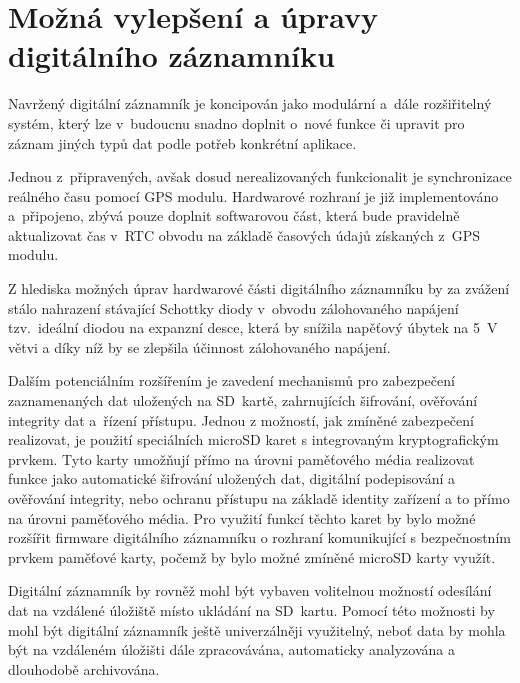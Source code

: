 \section{Možná vylepšení a úpravy digitálního záznamníku}
\label{mozne_rozsireni}
Navržený digitální záznamník je koncipován jako modulární a~dále rozšiřitelný systém, který lze v~budoucnu snadno doplnit o~nové funkce či upravit pro záznam jiných typů dat podle potřeb konkrétní aplikace.

Jednou z~připravených, avšak dosud nerealizovaných funkcionalit je synchronizace reálného času pomocí GPS modulu. Hardwarové rozhraní je již implementováno a~připojeno, zbývá pouze doplnit softwarovou část, která bude pravidelně aktualizovat čas v~RTC obvodu na základě časových údajů získaných z~GPS modulu.

Z hlediska možných úprav hardwarové části digitálního záznamníku by za zvážení stálo nahrazení stávající Schottky diody v~obvodu zálohovaného napájení tzv.~ideální diodou na expanzní desce, která by snížila napěťový úbytek na \SI{5}{\volt} větvi a díky níž by se zlepšila účinnost zálohovaného napájení.

Dalším potenciálním rozšířením je zavedení mechanismů pro zabezpečení zaznamenaných dat uložených na SD~kartě, zahrnujících šifrování, ověřování integrity dat a~řízení přístupu. Jednou z možností, jak zmíněné zabezpečení realizovat, je použití speciálních microSD karet s integrovaným kryptografickým prvkem. Tyto karty umožňují přímo na úrovni paměťového média realizovat funkce jako automatické šifrování uložených dat, digitální podepisování a ověřování integrity, nebo ochranu přístupu na základě identity zařízení a to přímo na úrovni paměťového média. Pro využití funkcí těchto karet by bylo možné rozšířit firmware digitálního záznamníku o rozhraní komunikující s bezpečnostním prvkem paměťové karty, počemž by bylo možné zmíněné microSD karty využít.

Digitální záznamník by rovněž mohl být vybaven volitelnou možností odesílání dat na vzdálené úložiště místo ukládání na SD~kartu. Pomocí této možnosti by mohl být digitální záznamník ještě univerzálněji využitelný, neboť data by mohla být na vzdáleném úložišti dále zpracovávána, automaticky analyzována a dlouhodobě archivována.


